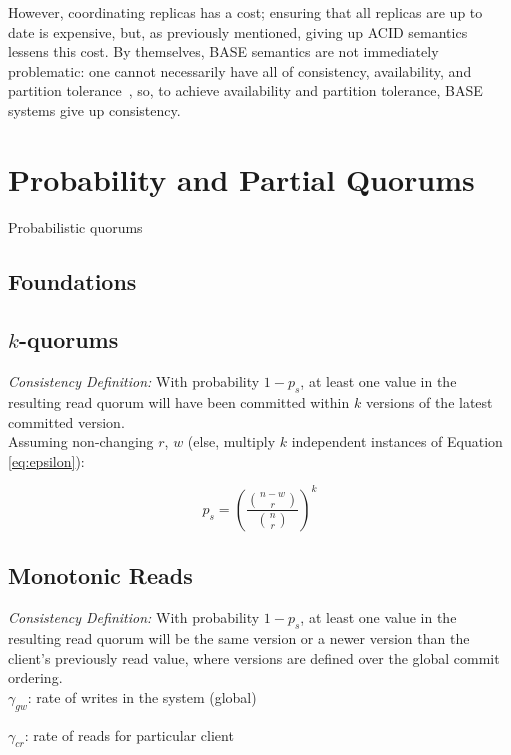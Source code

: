 \documentclass{vldb}
\begin{document}
However, coordinating replicas has a cost; ensuring that all replicas
are up to date is expensive, but, as previously mentioned, giving up
ACID semantics lessens this cost.  By themselves, BASE semantics are
not immediately problematic: one cannot necessarily have all of
consistency, availability, and partition tolerance~\cite{cap-proof},
so, to achieve availability and partition tolerance, BASE systems give
up consistency.


\section{Probability and Partial Quorums}
\label{sec:theory}

Probabilistic quorums~\cite{prob-quorum}

\subsection{Foundations}

\subsection{$k$-quorums}

\noindent\textit{Consistency Definition:} With probability $1-p_s$, at
least one value in the resulting read quorum will have been committed within $k$
versions of the latest committed version.\\

\noindent Assuming non-changing $r$, $w$ (else, multiply $k$ independent instances of Equation \ref{eq:epsilon}):

\begin{equation}
p_s = \left(\frac{{n-w \choose r}}{{n \choose r}}\right)^k
\end{equation}

\subsection{Monotonic Reads}

\noindent\textit{Consistency Definition:} With probability $1-p_s$, at
least one value in the resulting read quorum will be the same version or a newer
version than the client's previously read value, where versions are
defined over the global commit ordering.\\

\noindent $\gamma_{gw}$: rate of writes in the system (global)

\noindent $\gamma_{cr}$: rate of reads for particular client
\end{document}
